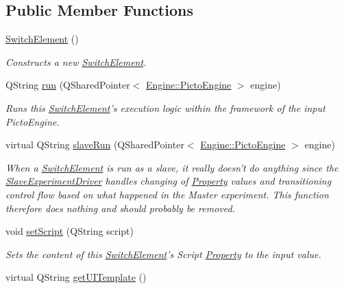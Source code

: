 \subsection*{Public Member Functions}
\begin{DoxyCompactItemize}
\item 
\hyperlink{class_picto_1_1_switch_element_ac7afae1f220ab96c7381f3888fec28bd}{Switch\-Element} ()
\begin{DoxyCompactList}\small\item\em Constructs a new \hyperlink{class_picto_1_1_switch_element}{Switch\-Element}. \end{DoxyCompactList}\item 
Q\-String \hyperlink{class_picto_1_1_switch_element_aebeedb240401d632a95305b049245969}{run} (Q\-Shared\-Pointer$<$ \hyperlink{class_picto_1_1_engine_1_1_picto_engine}{Engine\-::\-Picto\-Engine} $>$ engine)
\begin{DoxyCompactList}\small\item\em Runs this \hyperlink{class_picto_1_1_switch_element}{Switch\-Element}'s execution logic within the framework of the input Picto\-Engine. \end{DoxyCompactList}\item 
virtual Q\-String \hyperlink{class_picto_1_1_switch_element_a7e1271d534baafee851628f3f366211e}{slave\-Run} (Q\-Shared\-Pointer$<$ \hyperlink{class_picto_1_1_engine_1_1_picto_engine}{Engine\-::\-Picto\-Engine} $>$ engine)
\begin{DoxyCompactList}\small\item\em When a \hyperlink{class_picto_1_1_switch_element}{Switch\-Element} is run as a slave, it really doesn't do anything since the \hyperlink{class_picto_1_1_slave_experiment_driver}{Slave\-Experiment\-Driver} handles changing of \hyperlink{class_picto_1_1_property}{Property} values and transitioning control flow based on what happened in the Master experiment. This function therefore does nothing and should probably be removed. \end{DoxyCompactList}\item 
\hypertarget{class_picto_1_1_switch_element_a8a7f427b8bb7ebf91a698ce0199b68fb}{void \hyperlink{class_picto_1_1_switch_element_a8a7f427b8bb7ebf91a698ce0199b68fb}{set\-Script} (Q\-String script)}\label{class_picto_1_1_switch_element_a8a7f427b8bb7ebf91a698ce0199b68fb}

\begin{DoxyCompactList}\small\item\em Sets the content of this \hyperlink{class_picto_1_1_switch_element}{Switch\-Element}'s Script \hyperlink{class_picto_1_1_property}{Property} to the input value. \end{DoxyCompactList}\item 
\hypertarget{class_picto_1_1_switch_element_a51c11ef1c1bdd6375b0b645a93ae1ec4}{virtual Q\-String \hyperlink{class_picto_1_1_switch_element_a51c11ef1c1bdd6375b0b645a93ae1ec4}{get\-U\-I\-Template} ()}\label{class_picto_1_1_switch_element_a51c11ef1c1bdd6375b0b645a93ae1ec4}


\end{DoxyCompactItemize}
